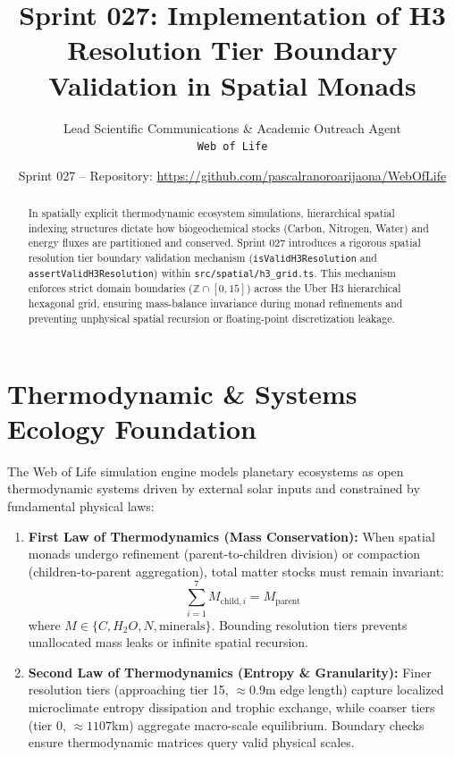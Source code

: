 \documentclass[11pt, a4paper]{article}
\title{\textbf{Sprint 027: Implementation of H3 Resolution Tier Boundary Validation in Spatial Monads}}
\author{Lead Scientific Communications \& Academic Outreach Agent \\ \texttt{Web of Life}}
\date{Sprint 027 -- Repository: \url{https://github.com/pascalranoroarijaona/WebOfLife}}
\begin{document}
\maketitle

\begin{abstract}
In spatially explicit thermodynamic ecosystem simulations, hierarchical spatial indexing structures dictate how biogeochemical stocks (Carbon, Nitrogen, Water) and energy fluxes are partitioned and conserved. Sprint 027 introduces a rigorous spatial resolution tier boundary validation mechanism (\texttt{isValidH3Resolution} and \texttt{assertValidH3Resolution}) within \texttt{src/spatial/h3\_grid.ts}. This mechanism enforces strict domain boundaries ($\mathbb{Z} \cap [0, 15]$) across the Uber H3 hierarchical hexagonal grid, ensuring mass-balance invariance during monad refinements and preventing unphysical spatial recursion or floating-point discretization leakage.
\end{abstract}

\section{Thermodynamic \& Systems Ecology Foundation}
The Web of Life simulation engine models planetary ecosystems as open thermodynamic systems driven by external solar inputs and constrained by fundamental physical laws:

\begin{enumerate}
    \item \textbf{First Law of Thermodynamics (Mass Conservation):} When spatial monads undergo refinement (parent-to-children division) or compaction (children-to-parent aggregation), total matter stocks must remain invariant:
    \begin{equation}
        \sum_{i=1}^{7} M_{\text{child}, i} = M_{\text{parent}}
    \end{equation}
    where $M \in \{C, H_2O, N, \text{minerals}\}$. Bounding resolution tiers prevents unallocated mass leaks or infinite spatial recursion.
    \item \textbf{Second Law of Thermodynamics (Entropy \& Granularity):} Finer resolution tiers (approaching tier 15, $\approx 0.9$m edge length) capture localized microclimate entropy dissipation and trophic exchange, while coarser tiers (tier 0, $\approx 1107$km) aggregate macro-scale equilibrium. Boundary checks ensure thermodynamic matrices query valid physical scales.
\end{enumerate}
\end{document}
